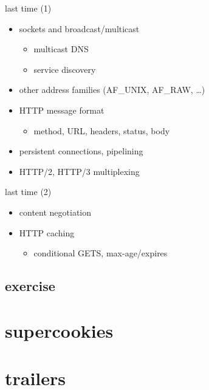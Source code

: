 \date{}
\title{}
\date{}
\usepackage{pgfplots}
\pgfplotsset{compat=1.14}

\begin{frame}
    \titlepage
\end{frame}

\begin{frame}{last time (1)}
    \begin{itemize}
    \item sockets and broadcast/multicast
        \begin{itemize}
        \item multicast DNS
        \item service discovery
        \end{itemize}
    \item other address families (AF\_UNIX, AF\_RAW, \ldots)
    \item HTTP message format
        \begin{itemize}
        \item method, URL, headers, status, body
        \end{itemize}
    \item persistent connections, pipelining
    \item HTTP/2, HTTP/3 multiplexing
    \end{itemize}
\end{frame}

\begin{frame}{last time (2)}
    \begin{itemize}
    \item content negotiation
    \item HTTP caching
        \begin{itemize}
        \item conditional GETS, max-age/expires
        \end{itemize}
    \end{itemize}
\end{frame}


\subsection{exercise}


\section{supercookies}


\section{trailers}


